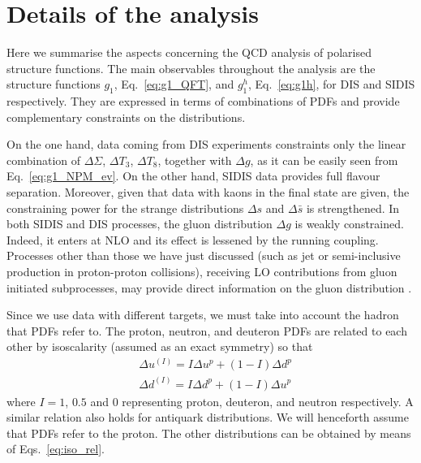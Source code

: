 \section{Details of the analysis}
\label{sec:4.2}
Here we summarise the aspects concerning the QCD analysis of polarised structure functions. The main observables throughout the analysis are the structure functions $g_1$, Eq.~\eqref{eq:g1_QFT}, and $g_1^h$, Eq.~\eqref{eq:g1h}, for DIS and SIDIS respectively. They are expressed in terms of combinations of PDFs and provide complementary constraints on the distributions.%

On the one hand, data coming from DIS experiments constraints only the linear combination of $\Delta \Sigma$, $\Delta T_3$, $\Delta T_8$, together with $\Delta g$, as it can be easily seen from Eq.~\eqref{eq:g1_NPM_ev}. On the other hand, SIDIS data provides full flavour separation. Moreover, given that data with kaons in the final state are given, the constraining power for the strange distributions $\Delta s$ and $\Delta \bar{s}$ is strengthened. In both SIDIS and DIS processes, the gluon distribution $\Delta g$ is weakly constrained. Indeed, it enters at NLO and its effect is lessened by the running coupling. Processes other than those we have just discussed (such as jet or semi-inclusive production in proton-proton collisions), receiving LO contributions from gluon initiated subprocesses, may provide direct information on the gluon distribution \cite{Rojo:2015acz}.%

Since we use data with different targets, we must take into account the hadron that PDFs refer to. The proton, neutron, and deuteron PDFs are related to each other by isoscalarity (assumed as an exact symmetry) so that
\begin{equation}
  \begin{split}
    &\Delta u^{(I)} = I \Delta u^p + ( 1 - I ) \Delta d^p \\
    &\Delta d^{(I)} = I \Delta d^p + ( 1 - I ) \Delta u^p
  \end{split}
  \label{eq:iso_rel}
\end{equation}
where $I=1$, $0.5$ and $0$ representing proton, deuteron, and neutron respectively. A similar relation also holds for antiquark distributions. We will henceforth assume that PDFs refer to the proton. The other distributions can be obtained by means of Eqs.~\eqref{eq:iso_rel}.%

